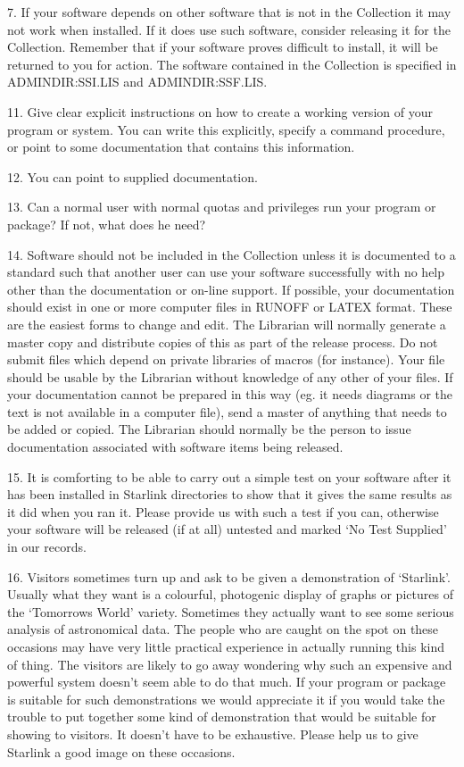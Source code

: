 7. If your software depends on other software that is not in the Collection it
may not work when installed.
If it does use such software, consider releasing it for the Collection.
Remember that if your software proves difficult to install, it will be returned
to you for action.
The software contained in the Collection is specified in ADMINDIR:SSI.LIS and
ADMINDIR:SSF.LIS.

11. Give clear explicit instructions on how to create a working version of your
program or system.
You can write this explicitly, specify a command procedure, or point to some
documentation that contains this information.

12. You can point to supplied documentation.

13. Can a normal user with normal quotas and privileges run your program or
package?
If not, what does he need?

14. Software should not be included in the Collection unless it is documented
to a standard such that another user can use your software successfully with no
help other than the documentation or on-line support.
If possible, your documentation should exist in one or more computer files in
RUNOFF or LATEX format.
These are the easiest forms to change and edit.
The Librarian will normally generate a master copy and distribute copies of this
as part of the release process.
Do not submit files which depend on private libraries of macros (for instance). 
Your file should be usable by the Librarian without knowledge of any other of
your files.
If your documentation cannot be prepared in this way (eg. it needs diagrams or
the text is not available in a computer file), send a master of anything that
needs to be added or copied.
The Librarian should normally be the person to issue documentation associated
with software items being released.

15. It is comforting to be able to carry out a simple test on your software
after it has been installed in Starlink directories to show that it gives the
same results as it did when you ran it.
Please provide us with such a test if you can, otherwise your software will be
released (if at all) untested and marked `No Test Supplied' in our records.

16. Visitors sometimes turn up and ask to be given a demonstration of
`Starlink'.
Usually what they want is a colourful, photogenic display of graphs or pictures
of the `Tomorrows World' variety.
Sometimes they actually want to see some serious analysis of astronomical data.
The people who are caught on the spot on these occasions may have very little
practical experience in actually running this kind of thing.
The visitors are likely to go away wondering why such an expensive and powerful
system doesn't seem able to do that much.
If your program or package is suitable for such demonstrations we would
appreciate it if you would take the trouble to put together some kind of
demonstration that would be suitable for showing to visitors.
It doesn't have to be exhaustive.
Please help us to give Starlink a good image on these occasions.

